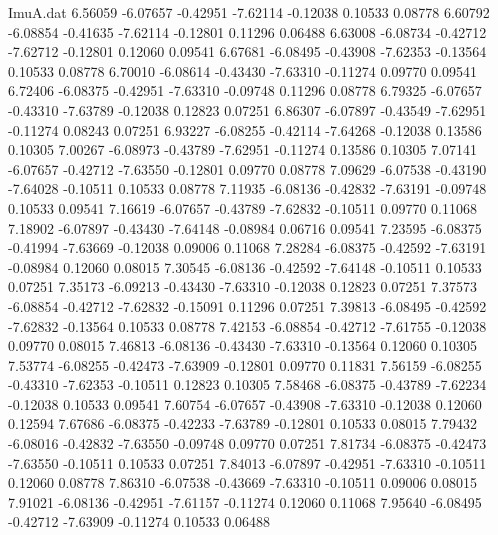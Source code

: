 \begin{filecontents}{ImuA.dat}
   6.56059   -6.07657   -0.42951   -7.62114   -0.12038    0.10533    0.08778
   6.60792   -6.08854   -0.41635   -7.62114   -0.12801    0.11296    0.06488
   6.63008   -6.08734   -0.42712   -7.62712   -0.12801    0.12060    0.09541
   6.67681   -6.08495   -0.43908   -7.62353   -0.13564    0.10533    0.08778
   6.70010   -6.08614   -0.43430   -7.63310   -0.11274    0.09770    0.09541
   6.72406   -6.08375   -0.42951   -7.63310   -0.09748    0.11296    0.08778
   6.79325   -6.07657   -0.43310   -7.63789   -0.12038    0.12823    0.07251
   6.86307   -6.07897   -0.43549   -7.62951   -0.11274    0.08243    0.07251
   6.93227   -6.08255   -0.42114   -7.64268   -0.12038    0.13586    0.10305
   7.00267   -6.08973   -0.43789   -7.62951   -0.11274    0.13586    0.10305
   7.07141   -6.07657   -0.42712   -7.63550   -0.12801    0.09770    0.08778
   7.09629   -6.07538   -0.43190   -7.64028   -0.10511    0.10533    0.08778
   7.11935   -6.08136   -0.42832   -7.63191   -0.09748    0.10533    0.09541
   7.16619   -6.07657   -0.43789   -7.62832   -0.10511    0.09770    0.11068
   7.18902   -6.07897   -0.43430   -7.64148   -0.08984    0.06716    0.09541
   7.23595   -6.08375   -0.41994   -7.63669   -0.12038    0.09006    0.11068
   7.28284   -6.08375   -0.42592   -7.63191   -0.08984    0.12060    0.08015
   7.30545   -6.08136   -0.42592   -7.64148   -0.10511    0.10533    0.07251
   7.35173   -6.09213   -0.43430   -7.63310   -0.12038    0.12823    0.07251
   7.37573   -6.08854   -0.42712   -7.62832   -0.15091    0.11296    0.07251
   7.39813   -6.08495   -0.42592   -7.62832   -0.13564    0.10533    0.08778
   7.42153   -6.08854   -0.42712   -7.61755   -0.12038    0.09770    0.08015
   7.46813   -6.08136   -0.43430   -7.63310   -0.13564    0.12060    0.10305
   7.53774   -6.08255   -0.42473   -7.63909   -0.12801    0.09770    0.11831
   7.56159   -6.08255   -0.43310   -7.62353   -0.10511    0.12823    0.10305
   7.58468   -6.08375   -0.43789   -7.62234   -0.12038    0.10533    0.09541
   7.60754   -6.07657   -0.43908   -7.63310   -0.12038    0.12060    0.12594
   7.67686   -6.08375   -0.42233   -7.63789   -0.12801    0.10533    0.08015
   7.79432   -6.08016   -0.42832   -7.63550   -0.09748    0.09770    0.07251
   7.81734   -6.08375   -0.42473   -7.63550   -0.10511    0.10533    0.07251
   7.84013   -6.07897   -0.42951   -7.63310   -0.10511    0.12060    0.08778
   7.86310   -6.07538   -0.43669   -7.63310   -0.10511    0.09006    0.08015
   7.91021   -6.08136   -0.42951   -7.61157   -0.11274    0.12060    0.11068
   7.95640   -6.08495   -0.42712   -7.63909   -0.11274    0.10533    0.06488

\end{filecontents}
